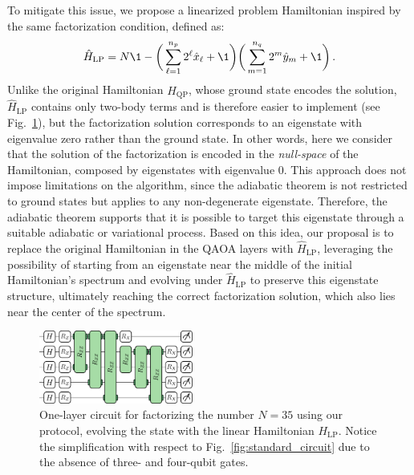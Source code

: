 To mitigate this issue, we propose a linearized problem Hamiltonian inspired by the same factorization condition, defined as:
\begin{equation}
	\hat{H}_\mathrm{LP} = N \1 - \bigg( \sum_{\ell=1}^{n_p} 2^\ell \hat{x}_\ell + \1 \bigg)
	\bigg( \sum_{m=1}^{n_q} 2^m \hat{y}_m + \1 \bigg)\,.
	\label{eq:linear_problem_hamiltonian}
\end{equation}
Unlike the original Hamiltonian $\hat{H}_\mathrm{QP}$, whose ground state encodes the solution, $\hat{H}_\mathrm{LP}$ contains only two-body terms and is therefore easier to implement (see Fig.~\ref{fig:linear_circuit_35.pdf}), but the factorization solution corresponds to an eigenstate with eigenvalue zero rather than the ground state. In other words, here we consider that the solution of the factorization is encoded in the \textit{null-space} of the Hamiltonian, composed by eigenstates with eigenvalue $0$. This approach does not impose limitations on the algorithm, since the adiabatic theorem is not restricted to ground states but applies to any non-degenerate eigenstate. Therefore, the adiabatic theorem supports that it is possible to target this eigenstate through a suitable adiabatic or variational process. Based on this idea, our proposal is to replace the original Hamiltonian in the QAOA layers with $\hat{H}_\mathrm{LP}$, leveraging the possibility of starting from an eigenstate near the middle of the initial Hamiltonian’s spectrum and evolving under $\hat{H}_\mathrm{LP}$ to preserve this eigenstate structure, ultimately reaching the correct factorization solution, which also lies near the center of the spectrum.

\begin{figure}[h]
    \centering
    \includegraphics[width=0.45\textwidth]{02-factorization/figs/linear_circuit_35.pdf}
    \caption{One-layer circuit for factorizing the number $N=35$ using our protocol, evolving the state with the linear Hamiltonian $H_{\mathrm{LP}}$. Notice the simplification with respect to Fig.~\ref{fig:standard_circuit}
    due to the absence of three- and four-qubit gates.}
    \label{fig:linear_circuit_35.pdf}
\end{figure}